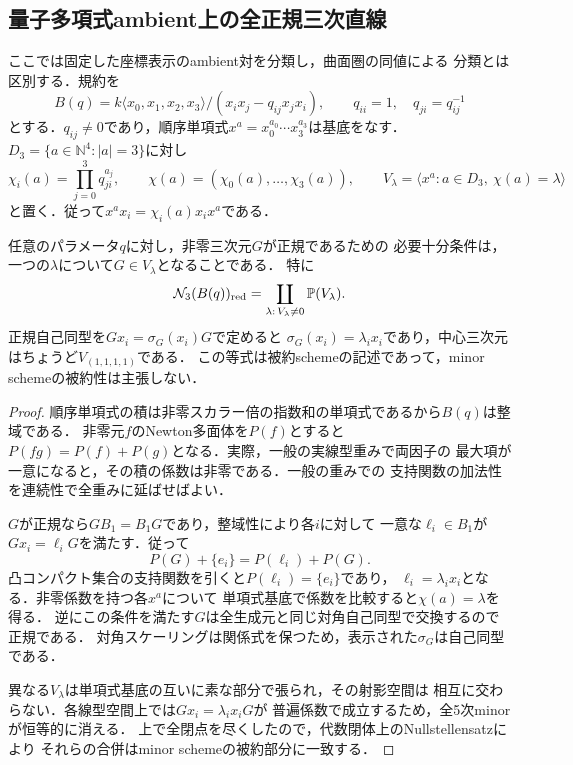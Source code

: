 \subsection{量子多項式ambient上の全正規三次直線}
\label{sec:skew-normal-incidence}
ここでは固定した座標表示のambient対を分類し，曲面圏の同値による
分類とは区別する．規約を
\[
 B(q)=k\langle x_0,x_1,x_2,x_3\rangle/
 (x_ix_j-q_{ij}x_jx_i),\qquad
 q_{ii}=1,\quad q_{ji}=q_{ij}^{-1}
\]
とする．$q_{ij}\ne0$であり，順序単項式$x^a=x_0^{a_0}\cdots x_3^{a_3}$は基底をなす．
$D_3=\{a\in\mathbb N^4:|a|=3\}$に対し
\[
 \chi_i(a)=\prod_{j=0}^3q_{ji}^{a_j},\qquad
 \chi(a)=(\chi_0(a),\ldots,\chi_3(a)),\qquad
 V_\lambda=\langle x^a:a\in D_3,\ \chi(a)=\lambda\rangle
\]
と置く．従って$x^ax_i=\chi_i(a)x_ix^a$である．
\begin{theorem}
\label{thm:skew-normal-cubics}
任意のパラメータ$q$に対し，非零三次元$G$が正規であるための
必要十分条件は，一つの$\lambda$について$G\in V_\lambda$となることである．
特に
\[
 \mathcal N_3(B(q))_{\mathrm{red}}
 =\coprod_{\lambda:\,V_\lambda\ne0}\mathbb P(V_\lambda).
\]
正規自己同型を$Gx_i=\sigma_G(x_i)G$で定めると
$\sigma_G(x_i)=\lambda_i x_i$であり，中心三次元はちょうど$V_{(1,1,1,1)}$である．
この等式は被約schemeの記述であって，minor schemeの被約性は主張しない．
\end{theorem}
\begin{proof}
順序単項式の積は非零スカラー倍の指数和の単項式であるから$B(q)$は整域である．
非零元$f$のNewton多面体を$P(f)$とすると
$P(fg)=P(f)+P(g)$となる．実際，一般の実線型重みで両因子の
最大項が一意になると，その積の係数は非零である．一般の重みでの
支持関数の加法性を連続性で全重みに延ばせばよい．

$G$が正規なら$GB_1=B_1G$であり，整域性により各$i$に対して
一意な$\ell_i\in B_1$が$Gx_i=\ell_iG$を満たす．従って
\[
 P(G)+\{e_i\}=P(\ell_i)+P(G).
\]
凸コンパクト集合の支持関数を引くと$P(\ell_i)=\{e_i\}$であり，
$\ell_i=\lambda_i x_i$となる．非零係数を持つ各$x^a$について
単項式基底で係数を比較すると$\chi(a)=\lambda$を得る．
逆にこの条件を満たす$G$は全生成元と同じ対角自己同型で交換するので正規である．
対角スケーリングは関係式を保つため，表示された$\sigma_G$は自己同型である．

異なる$V_\lambda$は単項式基底の互いに素な部分で張られ，その射影空間は
相互に交わらない．各線型空間上では$Gx_i=\lambda_i x_iG$が
普遍係数で成立するため，全5次minorが恒等的に消える．
上で全閉点を尽くしたので，代数閉体上のNullstellensatzにより
それらの合併はminor schemeの被約部分に一致する．
\end{proof}

